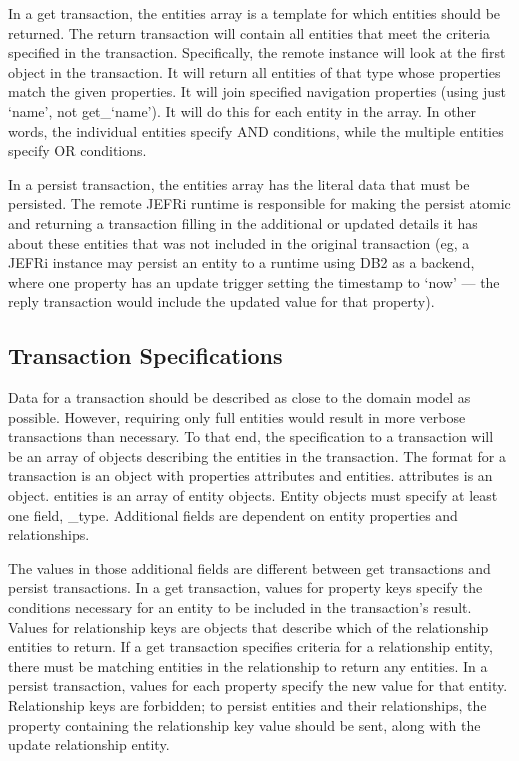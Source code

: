 \documentclass{article}
\begin{document}
In a {\ilcode get} transaction, the entities array is a template for which
entities should be returned. The return transaction will contain all entities
that meet the criteria specified in the transaction. Specifically, the remote
instance will look at the first object in the transaction. It will return all
entities of that type whose properties match the given properties. It will join
specified navigation properties (using just {\ilcode `name'}, not {\ilcode
get\_`name'}). It will do this for each entity in the array. In other words, the
individual entities specify AND conditions, while the multiple entities specify
OR conditions.

In a {\ilcode persist} transaction, the entities array has the literal data that
must be persisted. The remote JEFRi runtime is responsible for making the
persist atomic and returning a transaction filling in the additional or updated
details it has about these entities that was not included in the original
transaction (eg, a JEFRi instance may persist an entity to a runtime using DB2
as a backend, where one property has an update trigger setting the timestamp to
`now' --- the reply transaction would include the updated value for that
property).

\subsection{Transaction Specifications}

Data for a transaction should be described as close to the domain model as
possible. However, requiring only full entities would result in more verbose
transactions than necessary. To that end, the specification to a transaction
will be an array of objects describing the entities in the transaction. The
format for a transaction is an object with properties {\ilcode attributes} and
{\ilcode entities}. {\ilcode attributes} is an object. {\ilcode entities} is an
array of entity objects. Entity objects must specify at least one field,
{\ilcode \_type}. Additional fields are dependent on entity properties and
relationships.

The values in those additional fields are different between {\ilcode get}
transactions and {\ilcode persist} transactions. In a {\ilcode get} transaction,
values for property keys specify the conditions necessary for an entity to be
included in the transaction's result. Values for relationship keys are objects
that describe which of the relationship entities to return. If a {\ilcode get}
transaction specifies criteria for a relationship entity, there must be matching
entities in the relationship to return any entities. In a {\ilcode persist}
transaction, values for each property specify the new value for that entity.
Relationship keys are forbidden; to persist entities and their relationships,
the property containing the relationship key value should be sent, along with
the update relationship entity.
\end{document}
